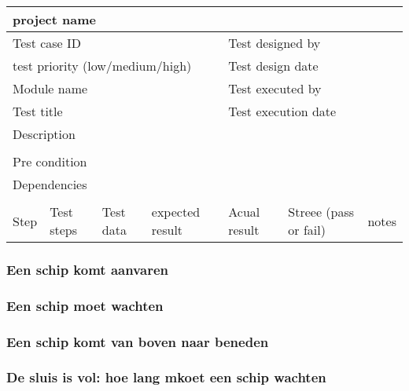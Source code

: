 \begin{tabular}{|l|l|l|l|l|l|l|} \hline
	\multicolumn{7}{|l|}{project name}                                                               \\ \hline
	\multicolumn{4}{|l|}{Test case ID}   &\multicolumn{3}{|l|}{Test designed by}                           \\ \hline
	\multicolumn{4}{|l|}{test priority (low/medium/high)}   &\multicolumn{3}{|l|}{Test design date}                           \\ \hline
	\multicolumn{4}{|l|}{Module name}   &\multicolumn{3}{|l|}{Test executed by}                           \\ \hline
	\multicolumn{4}{|l|}{Test title}   &\multicolumn{3}{|l|}{Test execution date}                           \\ \hline
	\multicolumn{4}{|l|}{Description}   &\multicolumn{3}{|l|}{ }                           \\ \hline 		
	\multicolumn{7}{|l|}{ }   																\\ \hline
	\multicolumn{7}{|l|}{Pre condition}                                                               \\ \hline
	\multicolumn{7}{|l|}{Dependencies}                                                               \\ \hline
	\multicolumn{7}{|l|}{ }   															\\ \hline
	Step  &  Test steps & Test data & expected result &Acual result &Streee (pass or fail)&notes  \\ \hline
	
\end{tabular}

\subsubsection{Een schip komt aanvaren}	

\subsubsection{Een schip moet wachten}

\subsubsection{Een schip komt van boven naar beneden}

\subsubsection{De sluis is vol: hoe lang mkoet een schip wachten}


